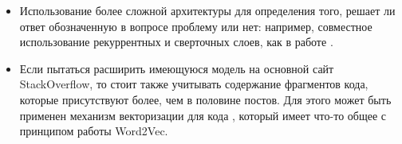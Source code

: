 \documentclass[../diploma.tex]{subfiles}
\begin{document}
	\begin{itemize}
		\item
		Использование более сложной архитектуры для определения того, решает ли ответ обозначенную в вопросе проблему или нет: например, 
		совместное использование рекуррентных и сверточных слоев, как в работе \cite{article:text_rnn_cnn}. 



		\item
		Если пытаться расширить имеющуюся модель на основной сайт StackOverflow, то стоит также учитывать содержание фрагментов кода, 
		которые присутствуют более, чем в половине постов.
		Для этого может быть применен механизм векторизации для кода \cite{article:code_embedding}, который имеет что-то общее с принципом работы Word2Vec.

	\end{itemize}
	
\end{document}

